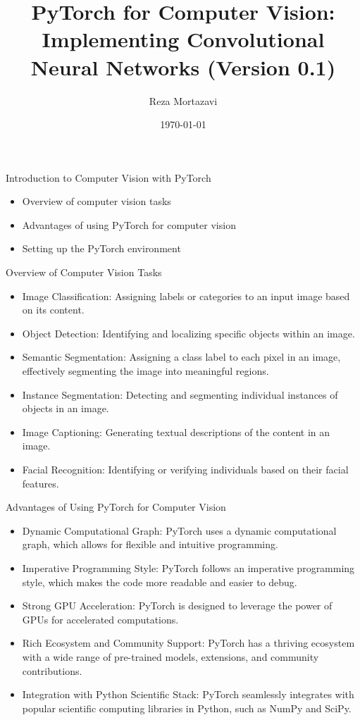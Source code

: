 \documentclass{beamer}
\title{PyTorch for Computer Vision: Implementing Convolutional Neural Networks (Version 0.1)}
\author{Reza Mortazavi}
\date{\today}
\begin{document}
\frame{\titlepage}

\begin{frame}{Introduction to Computer Vision with PyTorch}
\begin{itemize}
    \item Overview of computer vision tasks
    \item Advantages of using PyTorch for computer vision
    \item Setting up the PyTorch environment
\end{itemize}
\end{frame}

\begin{frame}{Overview of Computer Vision Tasks}
\begin{itemize}
    \item Image Classification: Assigning labels or categories to an input image based on its content.
    \item Object Detection: Identifying and localizing specific objects within an image.
    \item Semantic Segmentation: Assigning a class label to each pixel in an image, effectively segmenting the image into meaningful regions.
    \item Instance Segmentation: Detecting and segmenting individual instances of objects in an image.
    \item Image Captioning: Generating textual descriptions of the content in an image.
    \item Facial Recognition: Identifying or verifying individuals based on their facial features.
\end{itemize}
\end{frame}

\begin{frame}{Advantages of Using PyTorch for Computer Vision}
\begin{itemize}
    \item Dynamic Computational Graph: PyTorch uses a dynamic computational graph, which allows for flexible and intuitive programming. 
    \item Imperative Programming Style: PyTorch follows an imperative programming style, which makes the code more readable and easier to debug.
    \item Strong GPU Acceleration: PyTorch is designed to leverage the power of GPUs for accelerated computations.
    \item Rich Ecosystem and Community Support: PyTorch has a thriving ecosystem with a wide range of pre-trained models, extensions, and community contributions.
    \item Integration with Python Scientific Stack: PyTorch seamlessly integrates with popular scientific computing libraries in Python, such as NumPy and SciPy.
\end{itemize}
\end{frame}
\end{document}
